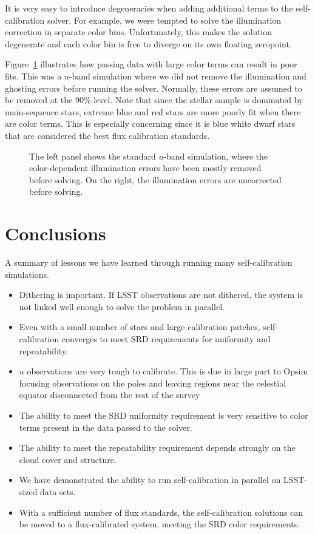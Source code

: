 \documentclass[12pt,preprint]{aastex}
\begin{document}
It is very easy to introduce degeneracies when adding additional terms to the self-calibration solver.  For example, we were tempted to solve the illumination correction in separate color bins.  Unfortunately, this makes the solution degenerate and each color bin is free to diverge on its own floating zeropoint.  

Figure~\ref{fig:badcolor} illustrates how passing data with large color terms can result in poor fits.  This was a $u$-band simulation where we did not remove the illumination and ghosting errors before running the solver.  Normally, these errors are assumed to be removed at the 90\%-level.  Note that since the stellar sample is dominated by main-sequence stars, extreme blue and red stars are more poorly fit when there are color terms.  This is especially concerning since it is blue white dwarf stars that are considered the best flux calibration standards.

\begin{figure}
\caption{The left panel shows the standard $u$-band simulation, where the color-dependent illumination errors have been mostly removed before solving.  On the right,  the illumination errors are uncorrected before solving.  \label{fig:badcolor}}
\end{figure}


\section{Conclusions}
A summary of lessons we have learned through running many self-calibration simulations.
\begin{itemize}
\item{Dithering is important.  If LSST observations are not dithered, the system is not linked well enough to solve the problem in parallel.}
\item{Even with a small number of stars and large calibration patches, self-calibration converges to meet SRD requirements for uniformity and repeatability.}
\item{$u$ observations are very tough to calibrate.  This is due in large part to Opsim focusing observations on the poles and leaving regions near the celestial equator disconnected from the rest of the survey}
\item{The ability to meet the SRD uniformity requirement is very sensitive to color terms present in the data passed to the solver.}
\item{The ability to meet the repeatability requirement depends strongly on the cloud cover and structure.  }
\item{We have demonstrated the ability to run self-calibration in parallel on LSST-sized data sets.}
\item{With a sufficient number of flux standards, the self-calibration solutions can be moved to a flux-calibrated system, meeting the SRD color requirements.}
\end{itemize}
\end{document}
